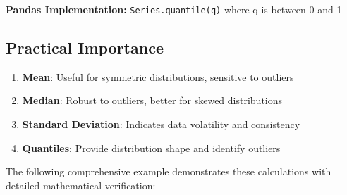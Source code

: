 \documentclass[11pt]{article}
\providecommand{\tightlist}{%
      \setlength{\itemsep}{0pt}\setlength{\parskip}{0pt}}
\begin{document}
\textbf{Pandas Implementation:} \texttt{Series.quantile(q)} where q is
between 0 and 1

\subsection{Practical Importance}\label{practical-importance}

\begin{enumerate}
\def\labelenumi{\arabic{enumi}.}
\tightlist
\item
  \textbf{Mean}: Useful for symmetric distributions, sensitive to
  outliers
\item
  \textbf{Median}: Robust to outliers, better for skewed distributions\\
\item
  \textbf{Standard Deviation}: Indicates data volatility and consistency
\item
  \textbf{Quantiles}: Provide distribution shape and identify outliers
\end{enumerate}

The following comprehensive example demonstrates these calculations with
detailed mathematical verification:
\end{document}
